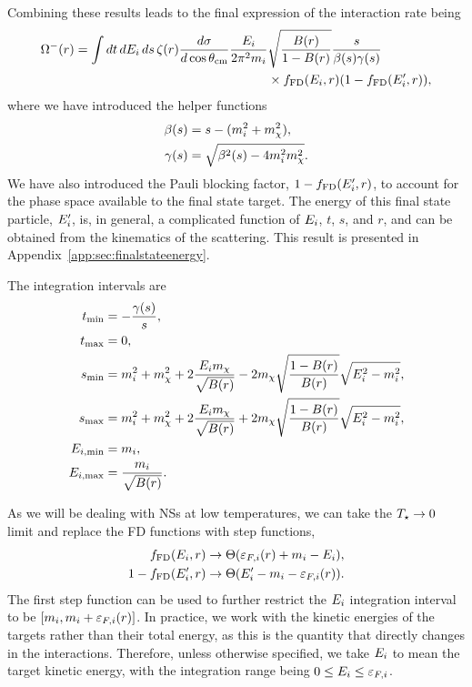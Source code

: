 Combining these results leads to the final expression of the interaction rate being
\begin{equation}
    \begin{split}
        \Omega^-(r) = \int dt\,dE_i\,ds\,\zeta(r) \frac{d\sigma}{d\cos\theta_\mathrm{cm}}\frac{E_i}{2\pi^2 m_i}&\sqrt{\frac{B(r)}{1 - B(r)}} \frac{s}{\beta(s)\gamma(s)}\\
        &\times f_{\rm FD}(E_i, r)(1 - f_{\rm FD}(E_i', r)),
    \end{split}
    \label{ch3:eq:int_rate_capture_full}
\end{equation}
where we have introduced the helper functions
\begin{align}
    \beta(s) & = s - (m_i^2 + m_\chi^2), \label{ch3:eq:beta_func}\\
    \gamma(s) & = \sqrt{\beta^2(s) - 4 m_i^2 m_\chi^2}.\label{ch3:eq:gamma_func}
\end{align}
We have also introduced the Pauli blocking factor, $1 - f_{\rm FD}(E_i', r)$, to account for the phase space available to the final state target. The energy of this final state particle, $E_i'$, is, in general, a complicated function of $E_i$, $t$, $s$, and $r$, and can be obtained from the kinematics of the scattering. This result is presented in Appendix~\ref{app:sec:finalstateenergy}.

The integration intervals are 
\begin{align}
    t_\mathrm{min} & = - \frac{\gamma(s)}{s},\\
    t_\mathrm{max} & = 0,\\
    s_\mathrm{min} & = m_i^2 + m_\chi^2 + 2 \frac{E_i m_\chi}{\sqrt{B(r)}} - 2m_\chi\sqrt{\frac{1 - B(r)}{B(r)}} \sqrt{E_i^2 - m_i^2}, \\
    s_\mathrm{max} & = m_i^2 + m_\chi^2 + 2 \frac{E_i m_\chi}{\sqrt{B(r)}} + 2m_\chi\sqrt{\frac{1 - B(r)}{B(r)}} \sqrt{E_i^2 - m_i^2}, \\
    E_{i,\mathrm{min}} & = m_i,\\
    E_{i,\mathrm{max}} & = \frac{m_i}{\sqrt{B(r)}}.
\end{align}

As we will be dealing with NSs at low temperatures, we can take the $T_\star\rightarrow 0$ limit and replace the FD functions with step functions, 
\begin{align}
    f_{\rm FD}(E_i, r) &\rightarrow \Theta(\varepsilon_{F,i}(r) +m_i - E_i),\\
    1 - f_{\rm FD}(E_i', r) & \rightarrow  \Theta(E_i'-m_i - \varepsilon_{F,i}(r) ).
\end{align}
The first step function can be used to further restrict the $E_i$ integration interval to be $[m_i, m_i + \varepsilon_{F,i}(r)]$. In practice, we work with the kinetic energies of the targets rather than their total energy, as this is the quantity that directly changes in the interactions. Therefore, unless otherwise specified, we take $E_i$ to mean the target kinetic energy, with the integration range being $0\le E_i\le \varepsilon_{F,i}$.

